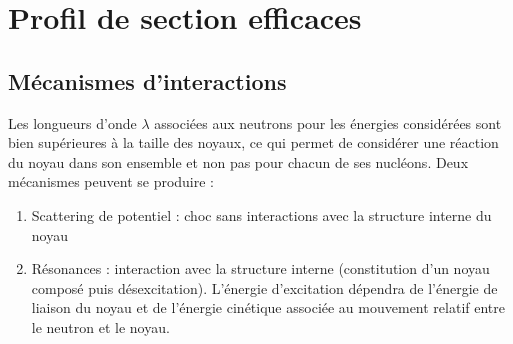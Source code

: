 \section{Profil de section efficaces}
\subsection{Mécanismes d'interactions}
Les longueurs d'onde $\lambda$ associées aux neutrons pour les énergies considérées sont bien 
supérieures à la taille des noyaux, ce qui permet de considérer une réaction du noyau dans son ensemble
et non pas pour chacun de ses nucléons. Deux mécanismes peuvent se produire :
\begin{enumerate}
\item Scattering de potentiel : choc sans interactions avec la structure interne du noyau
\item Résonances : interaction avec la structure interne (constitution d'un noyau 
composé puis désexcitation). L'énergie d'excitation dépendra de l'énergie de liaison du
noyau et de l'énergie cinétique associée au mouvement relatif entre le neutron et le noyau.
\end{enumerate}


